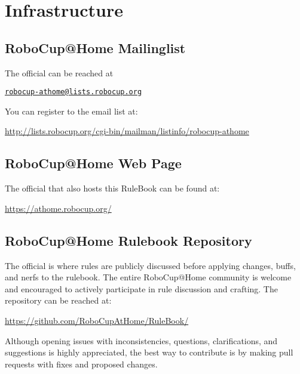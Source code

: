 \section{Infrastructure}
\label{sec:infrastructure}
\subsection{RoboCup@Home Mailinglist}
The official  can be reached at
\begin{center}
\href{mailto:robocup-athome@lists.robocup.org}{\texttt{robocup-athome@lists.robocup.org}}
\end{center}
You can register to the email list at:
\begin{center}
{\small\url{http://lists.robocup.org/cgi-bin/mailman/listinfo/robocup-athome}}
\end{center}

\subsection{RoboCup@Home Web Page}
The official  that also hosts this RuleBook can be found at:
\begin{center}
{\small\url{https://athome.robocup.org/}}
\end{center}

\subsection{RoboCup@Home Rulebook Repository}
The official  is where rules are publicly discussed before applying changes, buffs, and nerfs to the rulebook.
The entire RoboCup@Home community is welcome and encouraged to actively participate in rule discussion and crafting. The repository can be reached at:
\begin{center}
{\small\url{https://github.com/RoboCupAtHome/RuleBook/}}
\end{center}

Although opening issues with inconsistencies, questions, clarifications, and suggestions is highly appreciated, the best way to contribute is by making pull requests with fixes and proposed changes.


